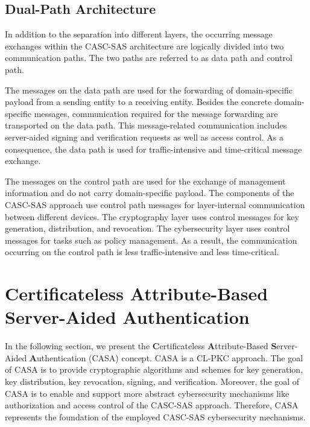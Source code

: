 \subsection{Dual-Path Architecture}
\label{sec:approach:casc:architecture:paths}
In addition to the separation into different layers, the occurring message exchanges within the CASC-SAS architecture are logically divided into two communication paths.
The two paths are referred to as data path and control path.

The messages on the data path are used for the forwarding of domain-specific payload from a sending entity to a receiving entity.
Besides the concrete domain-specific messages, communication required for the message forwarding are transported on the data path.
This message-related communication includes server-aided signing and verification requests as well as access control.
As a consequence, the data path is used for traffic-intensive and time-critical message exchange.

The messages on the control path are used for the exchange of management information and do not carry domain-specific payload.
The components of the CASC-SAS approach use control path messages for layer-internal communication between different devices.
The cryptography layer uses control messages for key generation, distribution, and revocation.
The cybersecurity layer uses control messages for tasks such as policy management.
As a result, the communication occurring on the control path is less traffic-intensive and less time-critical.

\section{Certificateless Attribute-Based Server-Aided Authentication}
\label{sec:approach:casa}
In the following section, we present the \textbf{C}ertificateless \textbf{A}ttribute-Based \textbf{S}erver-Aided \textbf{A}uthentication (CASA) concept.
CASA is a CL-PKC approach.
The goal of CASA is to provide cryptographic algorithms and schemes for key generation, key distribution, key revocation, signing, and verification.
Moreover, the goal of CASA is to enable and support more abstract cybersecurity mechanisms like authorization and access control of the CASC-SAS approach.
Therefore, CASA represents the foundation of the employed CASC-SAS cybersecurity mechanisms.

